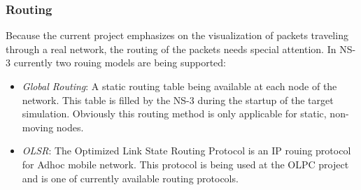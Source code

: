 \subsubsection{Routing}

Because the current project emphasizes on the visualization of packets
traveling through a real network, the routing of the packets needs
special attention. In NS-3 currently two rouing models are being supported:
\begin{itemize}
\item \textit{Global Routing}: A static routing table being available at
each node of the network. This table is filled by the NS-3 during
the startup of the target simulation. Obviously this routing method
is only applicable for static, non-moving nodes.
\item \textit{OLSR}\cite{rfc3626}: The Optimized Link State Routing Protocol
is an IP rouing protocol for Adhoc mobile network. This protocol is
being used at the OLPC project and is one of currently available routing
protocols.
\end{itemize}

